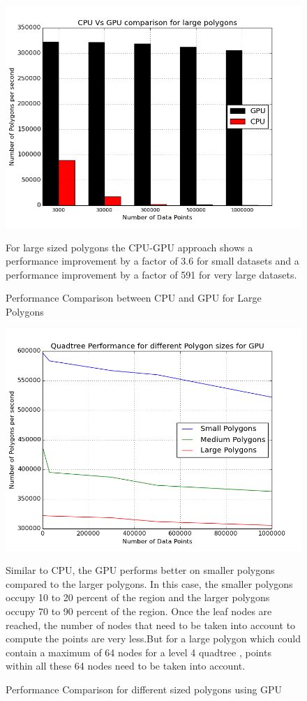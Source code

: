 \documentclass{article}
\begin{document}
\begin{figure}[ht]
\caption{Performance Comparison between CPU and GPU for Large Polygons}
\includegraphics[scale=0.5]{CPU_GPU_LargePoly3}

For large sized polygons the CPU-GPU approach shows a performance improvement by a factor of 3.6 for small datasets and a performance improvement by a factor of 591 for very large datasets.
\end{figure}

\begin{figure}[ht]
\caption{Performance Comparison for different sized polygons using GPU}
\includegraphics[scale=0.5]{Different_Sized_Polygon_GPU4}

Similar to CPU, the GPU performs better on smaller polygons compared to the larger polygons.
In this case, the smaller polygons occupy 10 to 20 percent of the region  and the larger polygons occupy 70 to 90 percent of the region. Once the leaf nodes are reached, the number of nodes that need to be taken into account to compute the points are very less.But for a large polygon which could contain a maximum of 64 nodes for a level 4 quadtree , points within all these 64 nodes need to be taken into account. 

\end{figure}
\end{document}
